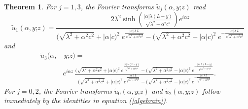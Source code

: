 \documentclass{article}
\renewcommand{\sinh}{\operatorname{sinh}}
\newtheorem{thm}{Theorem}
\begin{document}
\begin{thm}\label{tildeuthm}
For $j=1,3$, the Fourier transforms $\widetilde{u}_j(\alpha,y\mathord{;}z)$ read
\begin{equation}\label{uhat1solu}\widetilde{u}_1(\alpha,y\mathord{;}z)=\frac{2\lambda^2\sinh\left(\frac{\lvert\alpha\lvert\lambda(L-y)}{\sqrt{\lambda^2+\alpha^2c^2}}\right)e^{i\alpha z}}{\big(\sqrt{\lambda^2+\alpha^2c^2}+\lvert\alpha\lvert c\big)^2\;e^{\frac{\lvert\alpha\lvert\,\lambda\,L}{\sqrt{\lambda^2+\alpha^2c^2}}}-\big(\sqrt{\lambda^2+\alpha^2c^2}-\lvert\alpha\lvert c\big)^2\;e^{-\frac{\lvert\alpha\lvert\,\lambda\,L}{\sqrt{\lambda^2+\alpha^2c^2}}}}\end{equation}
and
\begin{align}\widetilde{u}_3(\alpha,&\,y\mathord{;}z)=\nonumber\\
&e^{i\alpha z}\,\frac{\big(\sqrt{\lambda^2+\alpha^2c^2}+\lvert\alpha\lvert c\big)^2\;e^{\frac{\lvert\alpha\lvert\,\lambda\,(L-y)}{\sqrt{\lambda^2+\alpha^2c^2}}}-\big(\sqrt{\lambda^2+\alpha^2c^2}-\lvert\alpha\lvert c\big)^2\;e^{-\frac{\lvert\alpha\lvert\,\lambda\,(L-y)}{\sqrt{\lambda^2+\alpha^2c^2}}}}{\big(\sqrt{\lambda^2+\alpha^2c^2}+\lvert\alpha\lvert c\big)^2\;e^{\frac{\lvert\alpha\lvert\,\lambda\,L}{\sqrt{\lambda^2+\alpha^2c^2}}}-\big(\sqrt{\lambda^2+\alpha^2c^2}-\lvert\alpha\lvert c\big)^2\;e^{-\frac{\lvert\alpha\lvert\,\lambda\,L}{\sqrt{\lambda^2+\alpha^2c^2}}}}.\label{uhat3solu}\end{align}
For $j=0,2$, the Fourier transforms $\widetilde{u}_0(\alpha,y\mathord{;}z)$ and $\widetilde{u}_2(\alpha,y\mathord{;}z)$ follow immediately by the identities in equation (\ref{algebrain}).\end{thm}
\end{document}

